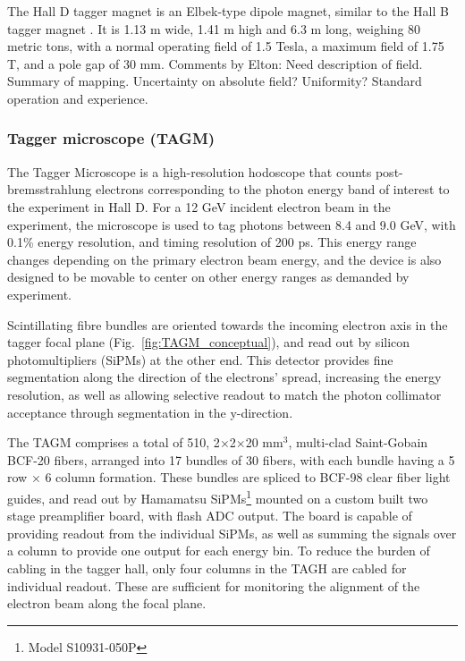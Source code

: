 The Hall D tagger magnet is an Elbek-type dipole magnet, similar to the Hall B tagger magnet \cite{BORGGREEN19631, Sober2000263}.
It is 1.13 m wide, 1.41 m high and 6.3 m long, weighing 80 metric tons, with a normal operating field of 1.5 Tesla, a maximum field of 1.75 T, and a pole gap of 30 mm.
{\color{red} Comments by Elton: Need description of field. Summary of mapping. Uncertainty on absolute field? Uniformity? Standard operation and experience.}


\subsubsection{Tagger microscope (TAGM)}\label{sec:TAGM}
The Tagger Microscope is a high-resolution hodoscope that counts post-bremsstrahlung electrons corresponding to the photon energy band of interest to the experiment in Hall D.
For a 12 GeV incident electron beam in the \GX{} experiment, the microscope is used to tag photons between 8.4 and 9.0 GeV, with 0.1\% energy resolution, and timing resolution of 200 ps.
This energy range changes depending on the primary electron beam energy, and the device is also designed to be movable to center on other energy ranges as demanded by experiment.

Scintillating fibre bundles are oriented towards the incoming electron axis in the tagger focal plane (Fig.~\ref{fig:TAGM_conceptual}), and read out by silicon photomultipliers (SiPMs) at the other end.
This detector provides fine segmentation along the direction of the electrons' spread, increasing the energy resolution, as well as allowing selective readout to match the photon collimator acceptance through segmentation in the y-direction.

The TAGM comprises a total of 510, 2$\times$2$\times$20 mm$^3$, multi-clad Saint-Gobain BCF-20 fibers, arranged into 17 bundles of 30 fibers, with each bundle having a 5 row $\times$ 6 column formation. These bundles are spliced to BCF-98 clear fiber light guides, and read out by Hamamatsu SiPMs\footnote{Model S10931-050P} mounted on a custom built two stage preamplifier board, with flash ADC output.
The board is capable of providing readout from the individual SiPMs, as well as summing the signals over a column to provide one output for each energy bin.
To reduce the burden of cabling in the tagger hall, only four columns in the TAGH are cabled for individual readout.
These are sufficient for monitoring the alignment of the electron beam along the focal plane.

